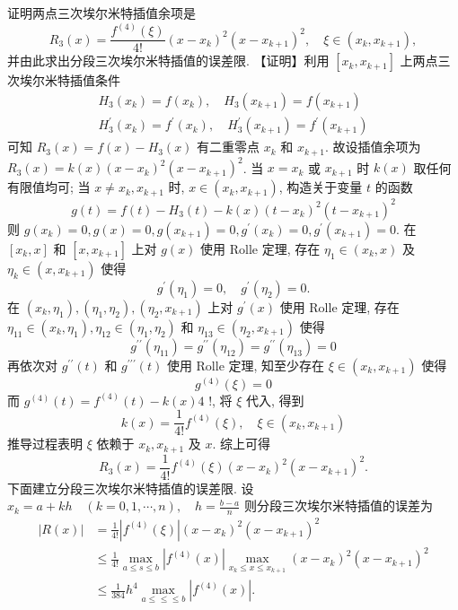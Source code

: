 \begin{tcolorbox}[enhanced,colback=10,colframe=9,breakable,coltitle=green!25!black,title=2024]

 证明两点三次埃尔米特插值余项是
$$
R_{3}(x)=\frac{f^{(4)}(\xi)}{4!}\left(x-x_{k}\right)^{2}\left(x-x_{k+1}\right)^{2}, \quad \xi \in\left(x_{k}, x_{k+1}\right),
$$
并由此求出分段三次埃尔米特插值的误差限.
\tcblower
【证明】利用 $ \left[x_{k}, x_{k+1}\right] $ 上两点三次埃尔米特插值条件
$$
\begin{array}{l}
H_{3}\left(x_{k}\right)=f\left(x_{k}\right), \quad H_{3}\left(x_{k+1}\right)=f\left(x_{k+1}\right) \\
H_{3}^{\prime}\left(x_{k}\right)=f^{\prime}\left(x_{k}\right), \quad H_{3}^{\prime}\left(x_{k+1}\right)=f^{\prime}\left(x_{k+1}\right)
\end{array}
$$
可知 $ R_{3}(x)=f(x)-H_{3}(x) $ 有二重零点 $ x_{k} $ 和 $ x_{k+1} $.
故设插值余项为 $ R_{3}(x)=k(x)\left(x-x_{k}\right)^{2}\left(x-x_{k+1}\right)^{2} $.
当 $ x=x_{k} $ 或 $ x_{k+1} $ 时 $ k(x) $ 取任何有限值均可;
当 $ x \neq x_{k}, x_{k+1} $ 时, $ x \in\left(x_{k}, x_{k+1}\right) $, 构造关于变量 $ t $ 的函数
$$
g(t)=f(t)-H_{3}(t)-k(x)\left(t-x_{k}\right)^{2}\left(t-x_{k+1}\right)^{2}
$$
则 $ g\left(x_{k}\right)=0, g(x)=0, g\left(x_{k+1}\right)=0, g^{\prime}\left(x_{k}\right)=0, g^{\prime}\left(x_{k+1}\right)=0 $.
在 $ \left[x_{k}, x\right] $ 和 $ \left[x, x_{k+1}\right] $ 上对 $ g(x) $ 使用 Rolle 定理, 存在 $ \eta_{1} \in\left(x_{k}, x\right) $ 及 $ \eta_{k} \in\left(x, x_{k+1}\right) $ 使得
$$
g^{\prime}\left(\eta_{1}\right)=0, \quad g^{\prime}\left(\eta_{2}\right)=0 .
$$
在 $ \left(x_{k}, \eta_{1}\right),\left(\eta_{1}, \eta_{2}\right),\left(\eta_{2}, x_{k+1}\right) $ 上对 $ g^{\prime}(x) $ 使用 Rolle 定理, 存在 $ \eta_{11} \in\left(x_{k}, \eta_{1}\right), \eta_{12} \in\left(\eta_{1}, \eta_{2}\right) $ 和 $ \eta_{13} \in\left(\eta_{2}, x_{k+1}\right) $ 使得
$$
g^{\prime \prime}\left(\eta_{11}\right)=g^{\prime \prime}\left(\eta_{12}\right)=g^{\prime \prime}\left(\eta_{13}\right)=0
$$
再依次对 $ g^{\prime \prime}(t) $ 和 $ g^{\prime \prime \prime}(t) $ 使用 Rolle 定理, 知至少存在 $ \xi \in\left(x_{k}, x_{k+1}\right) $ 使得
$$
g^{(4)}(\xi)=0
$$
而 $ g^{(4)}(t)=f^{(4)}(t)-k(x) 4 $ !, 将 $ \xi $ 代入, 得到
$$
k(x)=\frac{1}{4!} f^{(4)}(\xi), \quad \xi \in\left(x_{k}, x_{k+1}\right)
$$
推导过程表明 $ \xi $ 依赖于 $ x_{k}, x_{k+1} $ 及 $ x $. 综上可得
$$
R_{3}(x)=\frac{1}{4!} f^{(4)}(\xi)\left(x-x_{k}\right)^{2}\left(x-x_{k+1}\right)^{2} .
$$
下面建立分段三次埃尔米特插值的误差限.
设 $ x_{k}=a+k h \quad(k=0,1, \cdots, n), \quad h=\frac{b-a}{n} $
则分段三次埃尔米特插值的误差为
$$
\begin{aligned}
|R(x)| & =\frac{1}{4!}\left|f^{(4)}(\xi)\right|\left(x-x_{k}\right)^{2}\left(x-x_{k+1}\right)^{2} \\
& \leqslant \frac{1}{4!} \max _{a \leqslant s \leqslant b}\left|f^{(4)}(x)\right| \max _{x_{k} \leqslant x \leqslant x_{k+1}}\left(x-x_{k}\right)^{2}\left(x-x_{k+1}\right)^{2} \\
& \leqslant \frac{1}{384} h^{4} \max _{a \leqslant \leqslant \leqslant b}\left|f^{(4)}(x)\right| .
\end{aligned}
$$
\end{tcolorbox}

